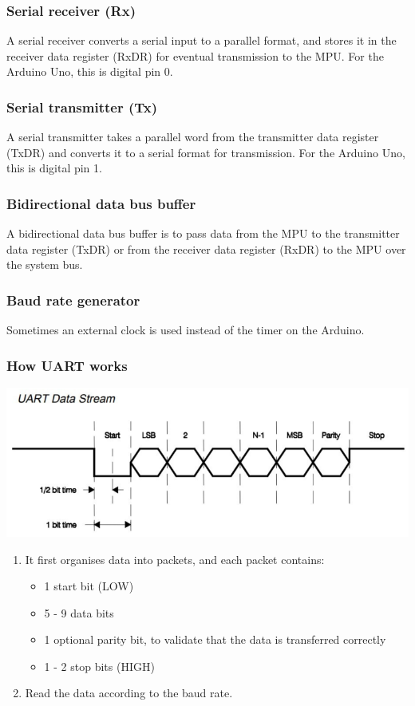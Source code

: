 \documentclass[11pt]{article}
\begin{document}
\subsubsection{Serial receiver (Rx)}
\label{sec:orgc323105}
A serial receiver converts a serial input to a parallel format, and stores it in the receiver data register (RxDR) for eventual transmission to the MPU. For the Arduino Uno, this is digital pin 0.

\subsubsection{Serial transmitter (Tx)}
\label{sec:org576d908}
A serial transmitter takes a parallel word from the transmitter data register (TxDR) and converts it to a serial format for transmission. For the Arduino Uno, this is digital pin 1.

\subsubsection{Bidirectional data bus buffer}
\label{sec:orgf0b6982}
A bidirectional data bus buffer is to pass data from the MPU to the transmitter data register (TxDR) or from the receiver data register (RxDR) to the MPU over the system bus.

\subsubsection{Baud rate generator}
\label{sec:org02c6502}
Sometimes an external clock is used instead of the timer on the Arduino.

\subsubsection{How UART works}
\label{sec:org21026bb}
\begin{center}
\includegraphics[width=.9\linewidth]{./images/uart-data-stream-diagram.png}
\end{center}
\begin{enumerate}
\item It first organises data into packets, and each packet contains:
\begin{itemize}
\item 1 start bit (LOW)
\item 5 - 9 data bits
\item 1 optional parity bit, to validate that the data is transferred correctly
\item 1 - 2 stop bits (HIGH)
\end{itemize}
\item Read the data according to the baud rate.
\end{enumerate}
\end{document}
